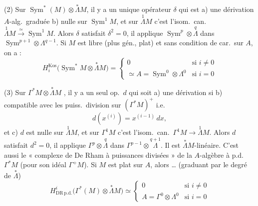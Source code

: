 \documentclass[11pt,a4paper]{article}
\begin{document}
(2) Sur $\operatorname{Sym}^*(M) \otimes \overset{*}{\Lambda} M$,  il y a un unique opérateur $\delta$ qui est  a) une dérivation  $A$-alg.\ graduée   b) nulle sur \struck{$\overset{*}{\Lambda}$} $\operatorname{Sym}^1 M$, et sur $\overset{1}{\Lambda} M$ c'est l'isom.\ can.\ $\overset{1}{\Lambda} M \xrightarrow{\simeq} \operatorname{Sym}^1 M$. Alors $\delta$ satisfait $\delta^2 = 0$, il applique $\operatorname{Sym}^p \otimes \overset{q}{\Lambda}$ dans $\operatorname{Sym}^{p+1} \otimes \Lambda^{q-1}$. Si $M$ est libre (plus gén., plat) et sans condition de car.\ sur $A$, on a    :
\[
  H_i^{\mathrm{Kos}}\bigl( \operatorname{Sym}^* M \otimes \overset{*}{\Lambda} M \bigr) =
  \begin{cases}
    0 & \text{si } i \neq 0 \\
    \simeq A = \operatorname{Sym}^0 \otimes \Lambda^0 & \text{si } i = 0
  \end{cases}
\]

(3) Sur $\Gamma^* M \otimes \overset{*}{\Lambda} M$ , il y a un seul op.\ $d$ qui soit  a) une dérivation si   b)  compatible avec les puiss.\ division sur $(\Gamma^* M)^+$ i.e.
\[
  d(x^{(i)}) = x^{(i-1)}\, dx ,
\]
et c) $d$ est nulle sur $\overset{1}{\Lambda} M$, et sur $\Gamma^1 M$ c'est l'isom.\ can.\ $\Gamma^1 M \to \overset{1}{\Lambda} M$. Alors $d$ satisfait $d^2 = 0$, il applique $\Gamma^p \otimes \overset{q}{\Lambda}$ dans $\Gamma^{p-1} \otimes \overset{q+1}{\Lambda}$. Il est $\overset{*}{\Lambda} M$-linéaire. C'est aussi
le « complexe de De Rham à puissances divisées » de la $A$-algèbre à p.d.\ $\Gamma^* M$ (pour son idéal $\Gamma^+ M$). Si $M$ est plat sur $A$, alors … (graduant par le degré de $\overset{*}{\Lambda}$)
\[
  H^i_{\mathrm{DR\,p.d.}}\bigl( \Gamma^*(M) \otimes \overset{*}{\Lambda} M \bigr) \simeq
  \begin{cases}
    0 & \text{si } i \neq 0 \\
    A = \Gamma^0 \otimes \Lambda^0 & \text{si } i = 0
  \end{cases}
\]
\end{document}
